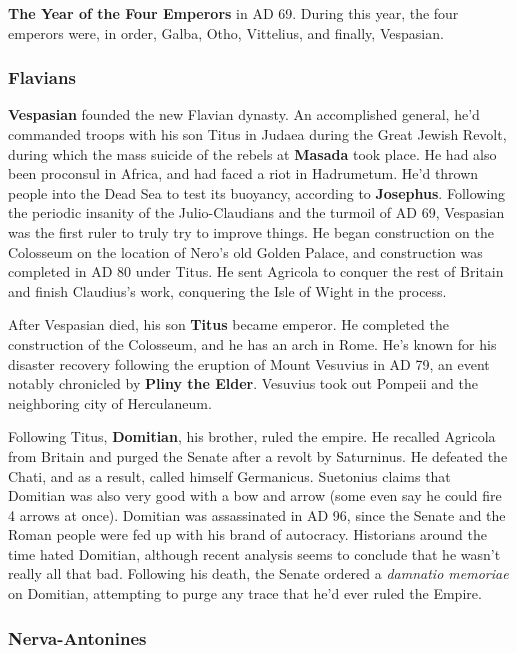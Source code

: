 \textbf{The Year of the Four Emperors} in AD 69. During this year, the four emperors were, in order,
Galba, Otho, Vittelius, and finally, Vespasian.

\subsubsection*{Flavians}

\textbf{Vespasian} founded the new Flavian dynasty.
An accomplished general,
he'd commanded troops with his son Titus in Judaea during the Great Jewish Revolt,
during which the mass suicide of the rebels at \textbf{Masada} took place.
He had also been proconsul in Africa, and had faced a riot in Hadrumetum.
He'd thrown people into the Dead Sea to test its buoyancy, according to \textbf{Josephus}.
Following the periodic insanity of the Julio-Claudians and the turmoil of AD 69,
Vespasian was the first ruler to truly try to improve things.
He began construction on the Colosseum on the location of Nero's old Golden Palace,
and construction was completed in AD 80 under Titus.
He sent Agricola to conquer the rest of Britain and finish Claudius's work,
conquering the Isle of Wight in the process.

After Vespasian died, his son \textbf{Titus} became emperor.
He completed the construction of the Colosseum, and he has an arch in Rome.
He's known for his disaster recovery following the eruption of Mount Vesuvius in AD 79,
an event notably chronicled by \textbf{Pliny the Elder}.
Vesuvius took out Pompeii and the neighboring city of Herculaneum.

Following Titus, \textbf{Domitian}, his brother, ruled the empire.
He recalled Agricola from Britain and purged the Senate after a revolt by Saturninus.
He defeated the Chati, and as a result, called himself Germanicus.
Suetonius claims that Domitian was also very good with a bow and arrow
(some even say he could fire 4 arrows at once).
Domitian was assassinated in AD 96,
since the Senate and the Roman people were fed up with his brand of autocracy.
Historians around the time hated Domitian,
although recent analysis seems to conclude that he wasn't really all that bad.
Following his death, the Senate ordered a \textit{damnatio memoriae} on Domitian,
attempting to purge any trace that he'd ever ruled the Empire.

\subsubsection*{Nerva-Antonines}

